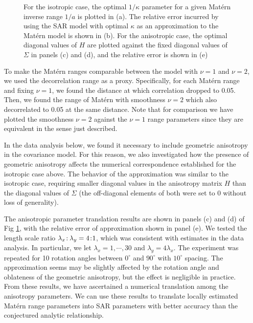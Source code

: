\documentclass[review]{elsarticle}
\begin{document}
\begin{figure}
    \centering
    \caption{For the isotropic case, the optimal $1/ \kappa$ parameter for a given Mat\'ern inverse range $1/a$ is plotted in (a). The relative error incurred by using the SAR model with optimal $\kappa$ as an approximation to the Mat\'ern model is shown in (b). For the anisotropic case, the optimal diagonal values of $H$ are plotted against the fixed diagonal values of $\Sigma$ in panels (c) and (d), and the relative error is shown in (e)}
    \label{f:1}
\end{figure}


To make the Mat\'ern ranges comparable between the model with $\nu=1$ and $\nu=2$, we used the decorrelation range as a proxy. Specifically, for each Mat\'ern range and fixing $\nu=1$, we found the distance at which correlation dropped to 0.05. Then, we found the range of Mat\'ern with smoothness $\nu=2$ which also decorrelated to 0.05 at the same distance. Note that for comparison we have plotted the smoothness $\nu=2$ against the $\nu=1$ range parameters since they are equivalent in the sense just described.

In the data analysis below, we found it necessary to include geometric anisotropy in the covariance model. For this reason, we also investigated how the presence of geometric anisotropy affects the numerical correspondence established for the isotropic case above. The behavior of the approximation was similar to the isotropic case, requiring smaller diagonal values in the anisotropy matrix $H$ than the diagonal values of $\Sigma$ (the off-diagonal elements of both were set to 0 without loss of generality). 

The anisotropic parameter translation results are shown in panels (c) and (d) of Fig \ref{f:1}, with the relative error of approximation shown in panel (e). We tested the length scale ratio $\lambda_x \colon \hspace{-0.4mm}  \lambda_y = 4 \colon \hspace{-1mm} 1$, which was consistent with estimates in the data analysis. In particular, we let $\lambda_x = 1, \cdots, 30$ and $\lambda_y = 4\lambda_x$. The experiment was repeated for 10 rotation angles between $0^{\circ}$ and $90^{\circ}$ with $10^{\circ}$ spacing. The approximation seems may be slightly affected by the rotation angle and oblateness of the geometric anisotropy, but the effect is negligible in practice. From these results, we have ascertained a numerical translation among the anisotropy parameters. We can use these results to translate locally estimated Mat\'ern range parameters into SAR parameters with better accuracy than the conjectured analytic relationship.
\end{document}

